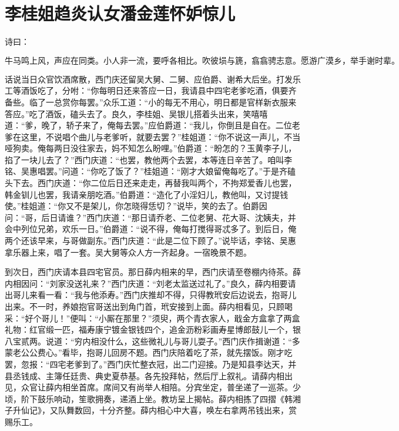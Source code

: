 

\chapter{李桂姐趋炎认女\KG 潘金莲怀妒惊儿}


诗曰：

\[
牛马鸣上风，声应在同类。小人非一流，要呼各相比。
吹彼埙与篪，翕翕骋志意。愿游广漠乡，举手谢时辈。
\]

话说当日众官饮酒席散，西门庆还留吴大舅、二舅、应伯爵、谢希大后坐。打发乐工等酒饭吃了，分咐：“你每明日还来答应一日，我请县中四宅老爹吃酒，俱要齐备些。临了一总赏你每罢。”众乐工道：“小的每无不用心，明日都是官样新衣服来答应。”吃了酒饭，磕头去了。良久，李桂姐、吴银儿搭着头出来，笑嘻嘻道：“爹，晚了，轿子来了，俺每去罢。”应伯爵道：“我儿，你倒且是自在。二位老爹在这里，不说唱个曲儿与老爹听，就要去罢？”桂姐道：“你不说这一声儿，不当哑狗卖。俺每两日没往家去，妈不知怎么盼哩。”伯爵道：“盼怎的？玉黄李子儿，掐了一块儿去了？”西门庆道：“也罢，教他两个去罢，本等连日辛苦了。咱叫李铭、吴惠唱罢。”问道：“你吃了饭了？”桂姐道：“刚才大娘留俺每吃了。”于是齐磕头下去。西门庆道：“你二位后日还来走走，再替我叫两个，不拘郑爱香儿也罢，韩金钏儿也罢，我请亲朋吃酒。”伯爵道：“造化了小淫妇儿，教他叫，又讨提钱使。”桂姐道：“你又不是架儿，你怎晓得恁切？”说毕，笑的去了。伯爵因问：“哥，后日请谁？”西门庆道：“那日请乔老、二位老舅、花大哥、沈姨夫，并会中列位兄弟，欢乐一日。”伯爵道：“说不得，俺每打搅得哥忒多了。到后日，俺两个还该早来，与哥做副东。”西门庆道：“此是二位下顾了。”说毕话，李铭、吴惠拿乐器上来，唱了一套。吴大舅等众人方一齐起身。一宿晚景不题。

到次日，西门庆请本县四宅官员。那日薛内相来的早，西门庆请至卷棚内待茶。薛内相因问：“刘家没送礼来？”西门庆道：“刘老太监送过礼了。”良久，薛内相要请出哥儿来看一看：“我与他添寿。”西门庆推却不得，只得教玳安后边说去，抱哥儿出来。不一时，养娘抱官哥送出到角门首，玳安接到上面。薛内相看见，只顾喝采：“好个哥儿！”便叫：“小厮在那里？”须臾，两个青衣家人，戢金方盒拿了两盒礼物：红官缎一匹，福寿康宁镀金银钱四个，追金沥粉彩画寿星博郎鼓儿一个，银八宝贰两。说道：“穷内相没什么，这些微礼儿与哥儿耍子。”西门庆作揖谢道：“多蒙老公公费心。”看毕，抱哥儿回房不题。西门庆陪着吃了茶，就先摆饭。刚才吃罢，忽报：“四宅老爹到了。”西门庆忙整衣冠，出二门迎接。乃是知县李达天，并县丞钱成、主簿任廷贵、典史夏恭基。各先投拜帖，然后厅上叙礼。请薛内相出见，众官让薛内相坐首席。席间又有尚举人相陪。分宾坐定，普坐递了一巡茶。少顷，阶下鼓乐响动，笙歌拥奏，递酒上坐。教坊呈上揭帖。薛内相拣了四摺《韩湘子升仙记》，又队舞数回，十分齐整。薛内相心中大喜，唤左右拿两吊钱出来，赏赐乐工。


